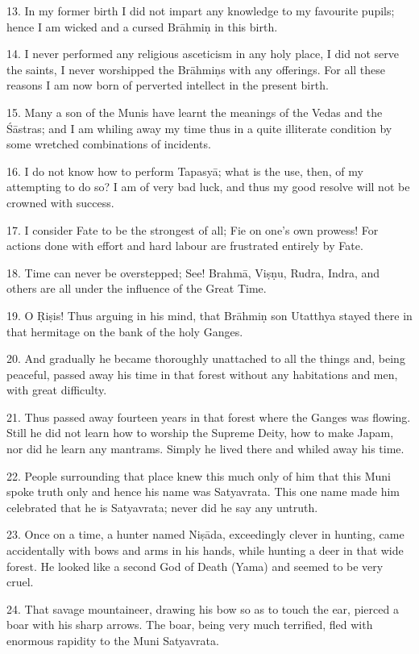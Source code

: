 13. In my former birth I did not impart any knowledge to my favourite pupils; hence I am wicked and a cursed Br\=ahmi\d{n} in this birth.

14. I never performed any religious asceticism in any holy place, I did not serve the saints, I never worshipped the Br\=ahmi\d{n}s with any offerings. For all these reasons I am now born of perverted intellect in the present birth.

15. Many a son of the Munis have learnt the meanings of the Vedas and the \'S\=astras; and I am whiling away my time thus in a quite illiterate condition by some wretched combinations of incidents.

16. I do not know how to perform Tapasy\=a; what is the use, then, of my attempting to do so? I am of very bad luck, and thus my good resolve will not be crowned with success.

17. I consider Fate to be the strongest of all; Fie on one's own prowess! For actions done with effort and hard labour are frustrated entirely by Fate.

18. Time can never be overstepped; See! Brahm\=a, Vi\d{s}\d{n}u, Rudra, Indra, and others are all under the influence of the Great Time.

19. O \d{R}i\d{s}is! Thus arguing in his mind, that Br\=ahmi\d{n} son Utatthya stayed there in that hermitage on the bank of the holy Ganges.

20. And gradually he became thoroughly unattached to all the things and, being peaceful, passed away his time in that forest without any habitations and men, with great difficulty.

21. Thus passed away fourteen years in that forest where the Ganges was flowing. Still he did not learn how to worship the Supreme Deity, how to make Japam, nor did he learn any mantrams. Simply he lived there and whiled away his time.

22. People surrounding that place knew this much only of him that this Muni spoke truth only and hence his name was Satyavrata. This one name made him celebrated that he is Satyavrata; never did he say any untruth.

23. Once on a time, a hunter named Ni\d{s}\=ada, exceedingly clever in hunting, came accidentally with bows and arms in his hands, while hunting a deer in that wide forest. He looked like a second God of Death (Yama) and seemed to be very cruel.

24. That savage mountaineer, drawing his bow so as to touch the ear, pierced a boar with his sharp arrows. The boar, being very much terrified, fled with enormous rapidity to the Muni Satyavrata.

